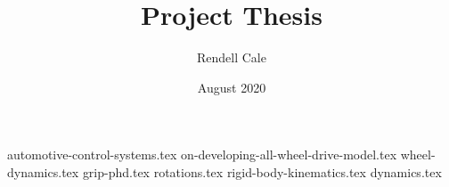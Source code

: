 \documentclass{article}
\title{Project Thesis}
\author{Rendell Cale}
\date{August 2020}
\begin{document}
\maketitle

{automotive-control-systems.tex}
{on-developing-all-wheel-drive-model.tex}
{wheel-dynamics.tex}
{grip-phd.tex}
{rotations.tex}
{rigid-body-kinematics.tex}
{dynamics.tex}

\printbibliography
\end{document}
